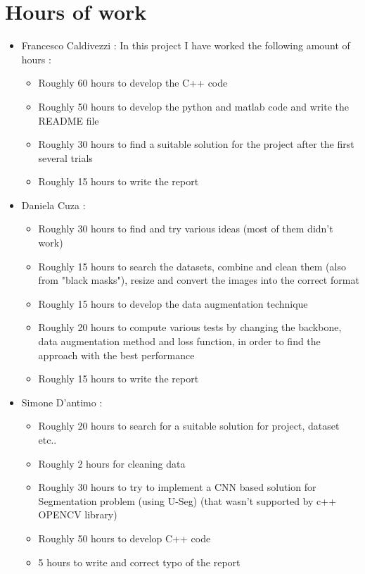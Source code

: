\section{Hours of work}
    \begin{itemize}
        \item Francesco Caldivezzi : In this project I have worked the following amount of hours : 
        \begin{itemize}
            \item Roughly 60 hours to develop the C++ code
            \item Roughly 50 hours to develop the python and matlab code and write the README file
            \item Roughly 30 hours to find a suitable solution for the project after the first several trials
            \item Roughly 15 hours to write the report
        \end{itemize}
        \item Daniela Cuza :
         \begin{itemize}
            \item Roughly 30 hours to find and try various ideas (most of them didn't work)
             \item Roughly 15 hours to search the datasets, combine and clean them (also from "black masks"), resize and convert the images into the correct format 
             \item Roughly 15 hours to develop the data augmentation technique
             \item Roughly 20 hours to compute various tests by changing the backbone, data augmentation method and loss function, in order to find the approach with the best performance
             \item Roughly 15 hours to write the report
         \end{itemize}   
        \item Simone D'antimo :
                    \begin{itemize}
            \item Roughly 20 hours to search for a suitable solution for project, dataset etc.. 
            \item Roughly 2 hours for cleaning data
            \item Roughly 30 hours to try to implement a CNN based solution for Segmentation problem (using U-Seg) (that wasn't supported by c++ OPENCV library) 
            \item Roughly 50 hours to develop C++ code
            \item 5 hours to write and correct typo of the report
        \end{itemize}
    \end{itemize}